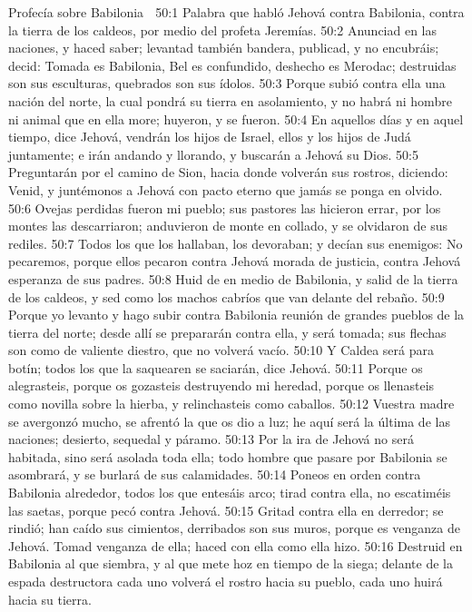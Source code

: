 Profecía sobre Babilonia  

50:1 Palabra que habló Jehová contra Babilonia,  contra la tierra de los caldeos, por medio del profeta Jeremías.  
50:2 Anunciad en las naciones, y haced saber; levantad también bandera, publicad, y no encubráis; decid: Tomada es Babilonia, Bel es confundido, deshecho es Merodac; destruidas son sus esculturas, quebrados son sus ídolos.  
50:3 Porque subió contra ella una nación del norte, la cual pondrá su tierra en asolamiento, y no habrá ni hombre ni animal que en ella more; huyeron, y se fueron.  
50:4 En aquellos días y en aquel tiempo, dice Jehová, vendrán los hijos de Israel, ellos y los hijos de Judá juntamente; e irán andando y llorando, y buscarán a Jehová su Dios.  
50:5 Preguntarán por el camino de Sion, hacia donde volverán sus rostros, diciendo: Venid, y juntémonos a Jehová con pacto eterno que jamás se ponga en olvido.  
50:6 Ovejas perdidas fueron mi pueblo; sus pastores las hicieron errar, por los montes las descarriaron; anduvieron de monte en collado, y se olvidaron de sus rediles.  
50:7 Todos los que los hallaban, los devoraban; y decían sus enemigos: No pecaremos, porque ellos pecaron contra Jehová morada de justicia, contra Jehová esperanza de sus padres.  
50:8 Huid de en medio de Babilonia, y salid de la tierra de los caldeos, y sed como los machos cabríos que van delante del rebaño.  
50:9 Porque yo levanto y hago subir contra Babilonia reunión de grandes pueblos de la tierra del norte; desde allí se prepararán contra ella, y será tomada; sus flechas son como de valiente diestro, que no volverá vacío.  
50:10 Y Caldea será para botín; todos los que la saquearen se saciarán, dice Jehová.  
50:11 Porque os alegrasteis, porque os gozasteis destruyendo mi heredad, porque os llenasteis como novilla sobre la hierba, y relinchasteis como caballos.  
50:12 Vuestra madre se avergonzó mucho, se afrentó la que os dio a luz; he aquí será la última de las naciones; desierto, sequedal y páramo.  
50:13 Por la ira de Jehová no será habitada, sino será asolada toda ella; todo hombre que pasare por Babilonia se asombrará, y se burlará de sus calamidades.  
50:14 Poneos en orden contra Babilonia alrededor, todos los que entesáis arco; tirad contra ella, no escatiméis las saetas, porque pecó contra Jehová.  
50:15 Gritad contra ella en derredor; se rindió; han caído sus cimientos, derribados son sus muros, porque es venganza de Jehová. Tomad venganza de ella; haced con ella como ella hizo.  
50:16 Destruid en Babilonia al que siembra, y al que mete hoz en tiempo de la siega; delante de la espada destructora cada uno volverá el rostro hacia su pueblo, cada uno huirá hacia su tierra.  

